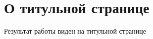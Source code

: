 \section{О титульной странице}



Результат работы виден на титульной странице \pageref{titlepage} %

\clearpage